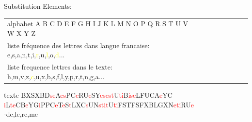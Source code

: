 \documentclass[10pt,xcolor=table]{beamer}
\begin{document}
\begin{frame}
\begin{exampleblock}{Substitution}
Elements:
\begin{tabular}{l!{\vrule}ccccccc} 
alphabet A B C D E F G H I J K L M N O P Q R S T U V W X Y Z \\   
liste fréquence des lettres dans langue francaise: e,s,a,n,t,i,\textcolor{yellow}{r},u,\textcolor{yellow}{l},o,\textcolor{yellow}{d}... \\
liste frequence lettres dans le texte: h,m,v,z,\textcolor{yellow}{c},u,x,b,s,f,l,y,p,r,t,n,g,a...
\end{tabular}
\end{exampleblock}
\begin{exampleblock}{texte}
BXSXBD\textcolor{red}{s}\textcolor{red}{e}A\textcolor{red}{e}\textcolor{red}{s}PC\textcolor{red}{e}RU\textcolor{red}{e}SY\textcolor{red}{e}\textcolor{red}{s}\textcolor{red}{e}\textcolor{red}{s}\textcolor{red}{t}U\textcolor{red}{t}\textcolor{red}{i}B\textcolor{red}{i}\textcolor{red}{s}\textcolor{red}{e}LFUCA\textcolor{red}{e}YC
\textcolor{red}{i}L\textcolor{red}{t}\textcolor{red}{e}CB\textcolor{red}{e}YG\textcolor{red}{i}PPC\textcolor{red}{e}T\textcolor{red}{e}S\textcolor{red}{t}LXC\textcolor{red}{s}UN\textcolor{red}{s}\textcolor{red}{t}\textcolor{red}{i}\textcolor{red}{t}U\textcolor{red}{t}\textcolor{red}{i}FSTFSFXBLGXN\textcolor{red}{e}\textcolor{red}{t}\textcolor{red}{i}RU\textcolor{red}{e} \\ \vspace{2\baselineskip}
-de,le,re,me
\end{exampleblock}
\end{frame}
\end{document}
